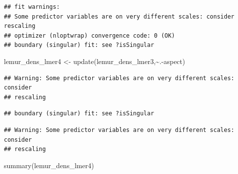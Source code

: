\documentclass[
  12pt,
]{article}
\newenvironment{Shaded}{\begin{snugshade}}{\end{snugshade}}
\newcommand{\FunctionTok}[1]{\textcolor[rgb]{0.00,0.00,0.00}{#1}}
\newcommand{\NormalTok}[1]{#1}
\newcommand{\OtherTok}[1]{\textcolor[rgb]{0.56,0.35,0.01}{#1}}
\newcommand{\SpecialCharTok}[1]{\textcolor[rgb]{0.00,0.00,0.00}{#1}}
\begin{document}
\begin{verbatim}
## fit warnings:
## Some predictor variables are on very different scales: consider rescaling
## optimizer (nloptwrap) convergence code: 0 (OK)
## boundary (singular) fit: see ?isSingular
\end{verbatim}

\begin{Shaded}
\begin{Highlighting}[]
\NormalTok{lemur\_dens\_lmer4 }\OtherTok{\textless{}{-}} \FunctionTok{update}\NormalTok{(lemur\_dens\_lmer3,}\SpecialCharTok{\textasciitilde{}}\NormalTok{.}\SpecialCharTok{{-}}\NormalTok{aspect)}
\end{Highlighting}
\end{Shaded}

\begin{verbatim}
## Warning: Some predictor variables are on very different scales: consider
## rescaling
\end{verbatim}

\begin{verbatim}
## boundary (singular) fit: see ?isSingular
\end{verbatim}

\begin{verbatim}
## Warning: Some predictor variables are on very different scales: consider
## rescaling
\end{verbatim}

\begin{Shaded}
\begin{Highlighting}[]
\FunctionTok{summary}\NormalTok{(lemur\_dens\_lmer4)}
\end{Highlighting}
\end{Shaded}
\end{document}
